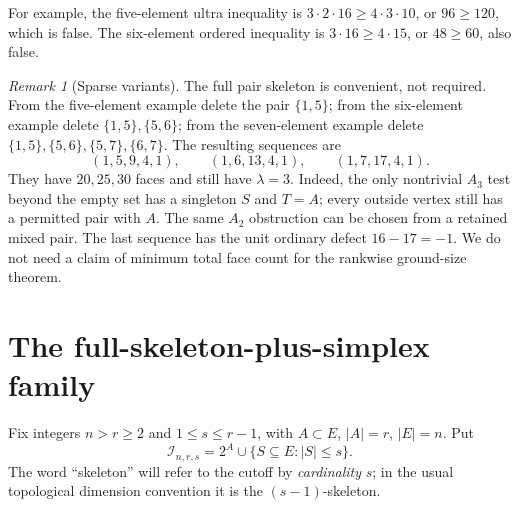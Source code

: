 \documentclass[11pt,letterpaper]{article}
\numberwithin{equation}{section}
\theoremstyle{definition}
\theoremstyle{remark}
\newtheorem{remark}[theorem]{Remark}
\newcommand{\I}{\mathcal I}
\begin{document}
For example, the five-element ultra inequality is
$3\cdot2\cdot16\ge4\cdot3\cdot10$, or $96\ge120$, which is false.
The six-element ordered inequality is $3\cdot16\ge4\cdot15$, or
$48\ge60$, also false.

\begin{remark}[Sparse variants]
The full pair skeleton is convenient, not required. From the five-element
example delete the pair $\{1,5\}$; from the six-element example delete
$\{1,5\},\{5,6\}$; from the seven-element example delete
$\{1,5\},\{5,6\},\{5,7\},\{6,7\}$.
The resulting sequences are
\[
 (1,5,9,4,1),\qquad (1,6,13,4,1),\qquad (1,7,17,4,1).
\]
They have $20,25,30$ faces and still have $\lambda=3$. Indeed, the only
nontrivial $A_3$ test beyond the empty set has a singleton $S$ and $T=A$;
every outside vertex still has a permitted pair with $A$. The same
$A_2$ obstruction can be chosen from a retained mixed pair. The last
sequence has the unit ordinary defect $16-17=-1$. We do not need a claim
of minimum total face count for the rankwise ground-size theorem.
\end{remark}

\section{The full-skeleton-plus-simplex family}
\label{sec:family}
Fix integers $n>r\ge2$ and $1\le s\le r-1$, with $A\subset E$, $|A|=r$,
$|E|=n$. Put
\begin{equation}\label{eq:family}
 \I_{n,r,s}=2^A\cup\{S\subseteq E:|S|\le s\}.
\end{equation}
The word ``skeleton'' will refer to the cutoff by \emph{cardinality} $s$;
in the usual topological dimension convention it is the
$(s-1)$-skeleton.
\end{document}
